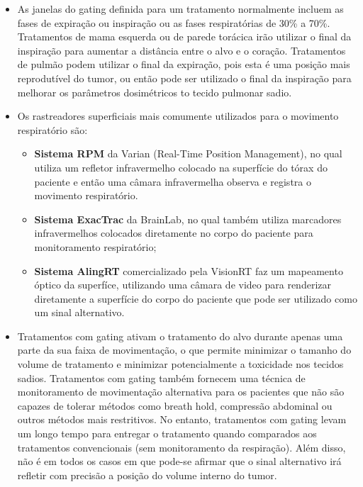 \documentclass[11pt,a4paper]{article}
\newcounter{exemplo}
\begin{document}
\begin{exemplo}
\begin{itemize}
        \item As janelas do gating definida para um tratamento normalmente incluem as fases de expiração ou inspiração ou as fases respiratórias de 30\% a 70\%. Tratamentos de mama esquerda ou de parede torácica irão utilizar o final da inspiração para aumentar a distância entre o alvo e o coração. Tratamentos de pulmão podem utilizar o final da expiração, pois esta é uma posição mais reprodutível do tumor, ou então pode ser utilizado o final da inspiração para melhorar os parâmetros dosimétricos to tecido pulmonar sadio.
        
        \item Os rastreadores superficiais mais comumente utilizados para o movimento respiratório são:
        
            \begin{itemize}[label=\textcolor{CarnationPink}{$\blacktriangleright$}]
                \item \textbf{Sistema RPM} da Varian (Real-Time Position Management), no qual utiliza um refletor infravermelho colocado na superfície do tórax do paciente e então uma câmara infravermelha observa e registra o movimento respiratório.
                \item \textbf{Sistema ExacTrac} da BrainLab, no qual também utiliza marcadores infravermelhos colocados diretamente no corpo do paciente para monitoramento respiratório;
                \item \textbf{Sistema AlingRT} comercializado pela VisionRT faz um mapeamento óptico da superfíce, utilizando uma câmara de video para renderizar diretamente a superfície do corpo do paciente que pode ser utilizado como um sinal alternativo. 
            \end{itemize}
        
        \item Tratamentos com gating ativam o tratamento do alvo durante apenas uma parte da sua faixa de movimentação, o que permite minimizar o tamanho do volume de tratamento e minimizar potencialmente a toxicidade nos tecidos sadios. Tratamentos com gating também fornecem uma técnica de monitoramento de movimentação alternativa para os pacientes que não são capazes de tolerar métodos como breath hold, compressão abdominal ou outros métodos mais restritivos. No entanto, tratamentos com gating levam um longo tempo para entregar o tratamento quando comparados aos tratamentos convencionais (sem monitoramento da respiração). Além disso, não é em todos os casos em que pode-se afirmar que o sinal alternativo irá refletir com precisão a posição do volume interno do tumor.
        

\end{itemize}
\end{exemplo}
\end{document}
